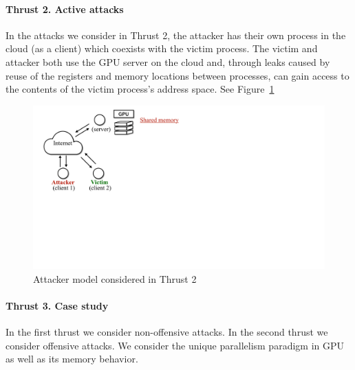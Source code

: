 \paragraph{Thrust 2. Active attacks}
In the attacks we consider in Thrust 2, the attacker has their own process in the cloud (as a client) which coexists with the victim process.
%
The victim and attacker both use the GPU server on the cloud and, through leaks caused by reuse of the registers and memory locations between processes, can gain access to the contents of the victim process's address space.
%
See Figure~\ref{fig:th2-attack}

\begin{figure}[h]
    \centering
    \includegraphics[clip,trim=0 17cm 10cm 0cm,width=0.72\pdfpagewidth]{figs/thrust2-fig.pdf}
    \caption{Attacker model considered in Thrust 2 }
    \label{fig:th2-attack}
    \end{figure}


\paragraph{Thrust 3. Case study}


In the first thrust we consider non-offensive attacks.
%
In the second thrust we consider offensive attacks.
%
We consider the unique parallelism paradigm in GPU as well as its memory behavior.

